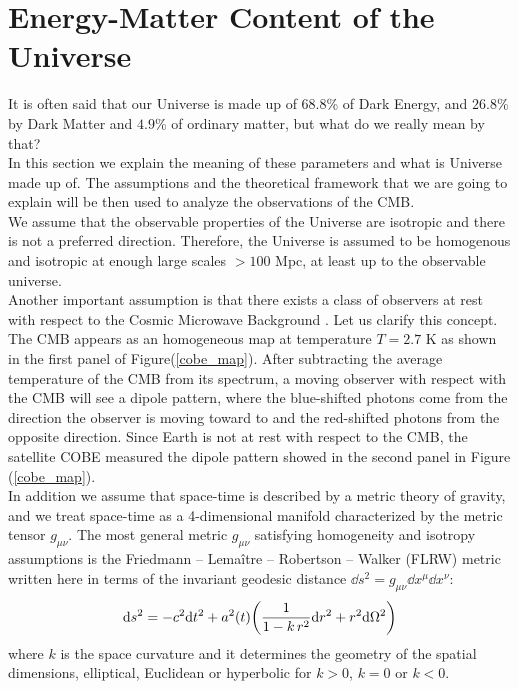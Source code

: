 \documentclass{article}
\begin{document}
\newpage


\section{Energy-Matter Content of the Universe} 
It is often said that our Universe is made up of $68.8$\% of Dark Energy, and $26.8 $\% by Dark Matter and $4.9 $\% of ordinary matter, but what do we really mean by that?\\
In this section we explain the meaning of these parameters and what is Universe made up of. 
The assumptions and the theoretical framework that we are going to explain will be then used to analyze the observations of the CMB.\\
We assume that the observable properties of the Universe are isotropic and there is not a preferred direction. 
Therefore, the Universe is assumed to be homogenous and isotropic at enough large scales $> 100$ Mpc, at least up to the observable universe.\\
Another important assumption is that there exists a class of observers at rest with respect to the Cosmic Microwave Background \citep{bartelmannStandardModelCosmology}.
Let us clarify this concept.
The CMB appears as an homogeneous map at temperature $T=2.7$ K as shown in the first panel of Figure(\ref{cobe_map}).
After subtracting the average temperature of the CMB from its spectrum, a moving observer with respect with the CMB will see a dipole pattern, where the blue-shifted photons come from the direction the observer is moving toward to and the red-shifted photons from the opposite direction.
Since Earth is not at rest with respect to the CMB, the satellite COBE measured the dipole pattern showed in the second panel in Figure (\ref{cobe_map}).\\
In addition we assume that space-time is described by a metric theory of gravity, and we treat space-time as a 4-dimensional manifold characterized by the metric tensor $g_{\mu \nu}$.
The most general metric $g_{\mu \nu}$ satisfying homogeneity and isotropy assumptions is the Friedmann – Lemaître – Robertson – Walker (FLRW) metric written here in terms of the invariant geodesic distance $\dd s ^2 = g_{\mu \nu} \dd x^{\mu} \dd x^{\nu}$:
\begin{equation}
\label{metric}
\dd s ^2 = -c ^2 \dd t^2 + a^2 (t) \qty( \frac{1}{1-k \, r^2} \dd r^2 + r^2 \dd \Omega ^2 )  
\end{equation}
where $k$ is the space curvature and it determines the geometry of the spatial dimensions, elliptical, Euclidean or hyperbolic for $k>0$, $k=0$ or $k<0$.
\end{document}
